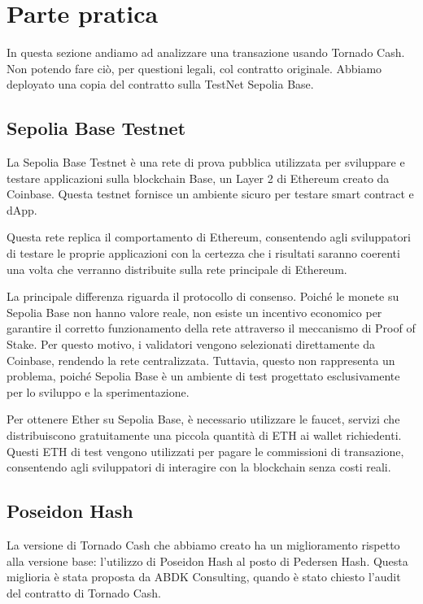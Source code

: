 \chapter{Parte pratica}

In questa sezione andiamo ad analizzare una transazione usando Tornado Cash. Non potendo fare ciò, per questioni legali, col contratto originale. Abbiamo deployato una copia del contratto sulla TestNet Sepolia Base.

\section{Sepolia Base Testnet}

La Sepolia Base Testnet è una rete di prova pubblica utilizzata per sviluppare e testare applicazioni sulla blockchain Base, un Layer 2 di Ethereum creato da Coinbase\cite{coinbase}. Questa testnet fornisce un ambiente sicuro per testare smart contract e dApp.

Questa rete replica il comportamento di Ethereum, consentendo agli sviluppatori di testare le proprie applicazioni con la certezza che i risultati saranno coerenti una volta che verranno distribuite sulla rete principale di Ethereum.

La principale differenza riguarda il protocollo di consenso. Poiché le monete su Sepolia Base non hanno valore reale, non esiste un incentivo economico per garantire il corretto funzionamento della rete attraverso il meccanismo di Proof of Stake. Per questo motivo, i validatori vengono selezionati direttamente da Coinbase, rendendo la rete centralizzata. Tuttavia, questo non rappresenta un problema, poiché Sepolia Base è un ambiente di test progettato esclusivamente per lo sviluppo e la sperimentazione.

Per ottenere Ether su Sepolia Base, è necessario utilizzare le faucet, servizi che distribuiscono gratuitamente una piccola quantità di ETH ai wallet richiedenti. Questi ETH di test vengono utilizzati per pagare le commissioni di transazione, consentendo agli sviluppatori di interagire con la blockchain senza costi reali.

\section{Poseidon Hash}

La versione di Tornado Cash che abbiamo creato ha un miglioramento rispetto alla versione base: l'utilizzo di Poseidon Hash al posto di Pedersen Hash. Questa miglioria è stata proposta da ABDK Consulting, quando è stato chiesto l'audit del contratto di Tornado Cash.

